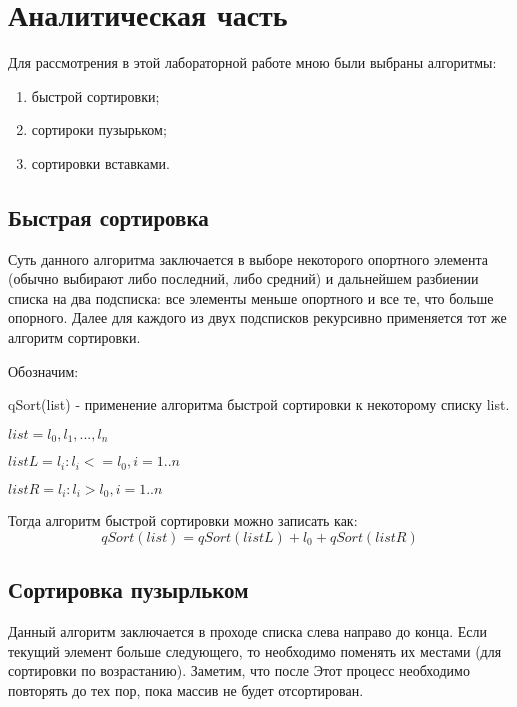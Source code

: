 \documentclass[12pt]{report}
\begin{document}
\chapter{Аналитическая часть}

	Для рассмотрения в этой лабораторной работе мною были выбраны алгоритмы:
\begin{enumerate}
	\item быстрой сортировки;
	\item сортироки пузырьком;
	\item сортировки вставками.
\end{enumerate}

\section{Быстрая сортировка}
	

	Суть данного алгоритма заключается в выборе некоторого опортного элемента (обычно выбирают либо последний, либо средний) и дальнейшем разбиении списка на два подсписка: все элементы меньше опортного и все те, что больше опорного. Далее для каждого из двух подсписков рекурсивно применяется тот же алгоритм сортировки.

Обозначим: 

{ qSort(list) - применение алгоритма быстрой сортировки к некоторому списку list.  }

{$ list = l_{0}, l_{1}, ... , l_{n}  $}

{$ listL =  l_{i} :  l_{i} <=  l_{0}, i = 1..n  $}

{$ listR = l_{i} :  l_{i} >  l_{0}, i = 1..n  $}


Тогда алгоритм быстрой сортировки можно записать как:
\begin{equation}
	qSort(list) = qSort(listL) + l_{0} + qSort(listR)
\end{equation}

\section{Сортировка пузырльком}

	Данный алгоритм заключается в проходе списка слева направо до конца. Если текущий элемент больше следующего, то необходимо поменять их местами (для сортировки по возрастанию). Заметим, что после  Этот процесс необходимо повторять до тех пор, пока массив не будет отсортирован.
\end{document}
